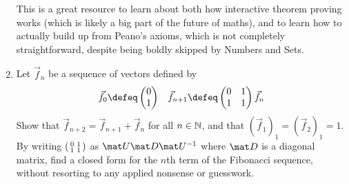 \documentclass[a4paper,12pt]{article}
\begin{document}
\begin{enumerate}[leftmargin=*]
  This is a great resource to learn about both how interactive theorem proving
  works (which is likely a big part of the future of maths), and to learn how
  to actually build up from Peano's axioms, which is not completely
  straightforward, despite being boldly skipped by Numbers and Sets.
 \item
  Let \(\vec f_n\) be a sequence of vectors defined by
  \begin{align*}
   \vec f_0 \defeq
    \begin{pmatrix} 0 \\ 1 \end{pmatrix}
   &&
   \vec f_{n + 1} \defeq
    \begin{pmatrix} 0 & 1 \\ 1 & 1 \end{pmatrix}\vec f_n
  \end{align*}
  Show that
  \(\vec f_{n + 2} = \vec f_{n + 1} + \vec f_n\) for all
  \(n \in \mathbb N\), and that \((\vec f_1)_1 = (\vec f_2)_1 = 1\). By
  writing \(\begin{psmallmatrix} 0 & 1 \\ 1 & 1 \end{psmallmatrix}\) as
  \(\mat U \mat D \mat U^{-1}\) where \(\mat D\) is a diagonal matrix,
  find a closed form for the \(n\)th term of the Fibonacci sequence, without
  resorting to any applied nonsense or guesswork.
\end{enumerate}
\end{document}
